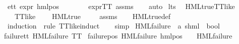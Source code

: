 \begin{isabellebody}
\ e{}{\isacharunderscore}{\kern0pt}tt{\isacharcolon}{\kern0pt}\ {\isachardoublequoteopen}expr{\isacharunderscore}{\kern0pt}{}\ {\isacharparenleft}{\kern0pt}hml{\isacharunderscore}{\kern0pt}pos\ {\isasymalpha}\ {\isasymchi}{\isacharparenright}{\kern0pt}\ {\isacharequal}{\kern0pt}\ {}{\isachardoublequoteclose}\isanewline
%
\isadelimproof
\ \ %
\endisadelimproof
%
\isatagproof
{}\isamarkupfalse%
\ expr{\isacharunderscore}{\kern0pt}TT\ assms\isanewline
\ \ \isamarkupfalse%
\ auto%
\endisatagproof
{\isafoldproof}%
%
\isadelimproof
\isanewline
%
\endisadelimproof
\isanewline
{}\isamarkupfalse%
\ lts\ \isanewline
{}\isamarkupfalse%
\ HML{\isacharunderscore}{\kern0pt}true{\isacharunderscore}{\kern0pt}TT{\isacharunderscore}{\kern0pt}like{\isacharcolon}{\kern0pt}\isanewline
\ \ \ {\isachardoublequoteopen}TT{\isacharunderscore}{\kern0pt}like\ {\isasymphi}{\isachardoublequoteclose}\isanewline
\ \ \ {\isachardoublequoteopen}HML{\isacharunderscore}{\kern0pt}true\ {\isasymphi}{\isachardoublequoteclose}\isanewline
%
\isadelimproof
\ \ %
\endisadelimproof
%
\isatagproof
{}\isamarkupfalse%
\ assms\isanewline
\ \ \isamarkupfalse%
\ HML{\isacharunderscore}{\kern0pt}true{\isacharunderscore}{\kern0pt}def\isanewline
\ \ \isamarkupfalse%
\ {\isacharparenleft}{\kern0pt}induction\ {\isasymphi}\ rule{\isacharcolon}{\kern0pt}\ TT{\isacharunderscore}{\kern0pt}like{\isachardot}{\kern0pt}induct{\isacharparenright}{\kern0pt}\isanewline
\ \ \isamarkupfalse%
\ simp{\isacharplus}{\kern0pt}%
\endisatagproof
{\isafoldproof}%
%
\isadelimproof
\isanewline
%
\endisadelimproof
{}\isamarkupfalse%
\isanewline
\isanewline
{}\isamarkupfalse%
\ HML{\isacharunderscore}{\kern0pt}failure\ {\isacharcolon}{\kern0pt}{\isacharcolon}{\kern0pt}\ {\isachardoublequoteopen}{\isacharparenleft}{\kern0pt}{\isacharprime}{\kern0pt}a{\isacharcomma}{\kern0pt}\ {\isacharprime}{\kern0pt}s{\isacharparenright}{\kern0pt}hml\ {\isasymRightarrow}\ bool{\isachardoublequoteclose}\isanewline
\ \ \isanewline
failure{\isacharunderscore}{\kern0pt}tt{\isacharcolon}{\kern0pt}\ {\isachardoublequoteopen}HML{\isacharunderscore}{\kern0pt}failure\ TT{\isachardoublequoteclose}\ {\isacharbar}{\kern0pt}\isanewline
failure{\isacharunderscore}{\kern0pt}pos{\isacharcolon}{\kern0pt}\ {\isachardoublequoteopen}HML{\isacharunderscore}{\kern0pt}failure\ {\isacharparenleft}{\kern0pt}hml{\isacharunderscore}{\kern0pt}pos\ {\isasymalpha}\ {\isasymphi}{\isacharparenright}{\kern0pt}{\isachardoublequoteclose}\ \ {\isachardoublequoteopen}HML{\isacharunderscore}{\kern0pt}failure\ {\isasymphi}{\isachardoublequoteclose}\ {\isacharbar}{\kern0pt}\isanewline

\end{isabellebody}
